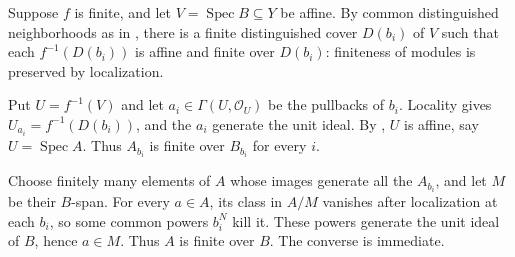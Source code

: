 Suppose $f$ is finite, and let $V=\operatorname{Spec}B\subseteq Y$ be affine. By common distinguished neighborhoods as in , there is a finite distinguished cover $D(b_i)$ of $V$ such that each $f^{-1}(D(b_i))$ is affine and finite over $D(b_i)$: finiteness of modules is preserved by localization.

Put $U=f^{-1}(V)$ and let $a_i\in\Gamma(U,\mathcal O_U)$ be the pullbacks of $b_i$. Locality gives $U_{a_i}=f^{-1}(D(b_i))$, and the $a_i$ generate the unit ideal. By , $U$ is affine, say $U=\operatorname{Spec}A$. Thus $A_{b_i}$ is finite over $B_{b_i}$ for every $i$.

Choose finitely many elements of $A$ whose images generate all the $A_{b_i}$, and let $M$ be their $B$-span. For every $a\in A$, its class in $A/M$ vanishes after localization at each $b_i$, so some common powers $b_i^N$ kill it. These powers generate the unit ideal of $B$, hence $a\in M$. Thus $A$ is finite over $B$. The converse is immediate.

